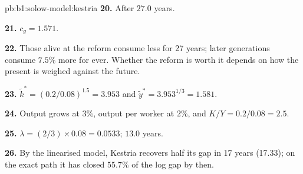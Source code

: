 \begin{solution}{pb:b1:solow-model:kestria}
\textbf{20.} After $27.0$ years.

\textbf{21.} $c_g = 1.571$.

\textbf{22.} Those alive at the reform consume less for 27 years; later
generations consume $7.5\%$ more for ever. Whether the reform is worth it
depends on how the present is weighed against the future.

\textbf{23.} $\tilde k^* = (0.2/0.08)^{1.5} = 3.953$ and $\tilde y^* = 3.953^{1/3} = 1.581$.

\textbf{24.} Output grows at $3\%$, output per worker at $2\%$, and $K/Y = 0.2/0.08 = 2.5$.

\textbf{25.} $\lambda = (2/3) \times 0.08 = 0.0533$;  $13.0$ years.

\textbf{26.} By the linearised model, Kestria recovers half its gap in 17
years (17.33); on the exact path it has closed $55.7\%$ of the log gap by then.
\end{solution}
